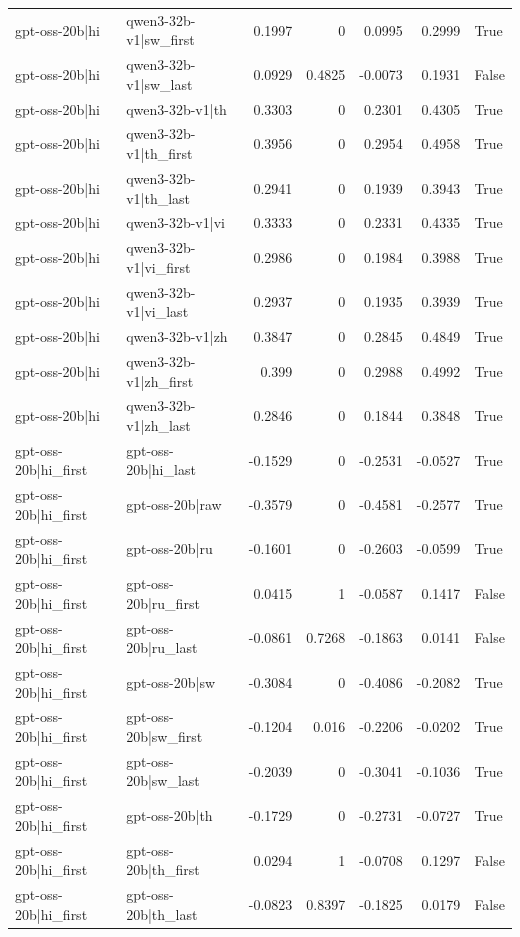 \begin{table}
\begin{tabular}{l l r r r r l}
gpt-oss-20b|hi & qwen3-32b-v1|sw_first & 0.1997 & 0 & 0.0995 & 0.2999 & True \\
gpt-oss-20b|hi & qwen3-32b-v1|sw_last & 0.0929 & 0.4825 & -0.0073 & 0.1931 & False \\
gpt-oss-20b|hi & qwen3-32b-v1|th & 0.3303 & 0 & 0.2301 & 0.4305 & True \\
gpt-oss-20b|hi & qwen3-32b-v1|th_first & 0.3956 & 0 & 0.2954 & 0.4958 & True \\
gpt-oss-20b|hi & qwen3-32b-v1|th_last & 0.2941 & 0 & 0.1939 & 0.3943 & True \\
gpt-oss-20b|hi & qwen3-32b-v1|vi & 0.3333 & 0 & 0.2331 & 0.4335 & True \\
gpt-oss-20b|hi & qwen3-32b-v1|vi_first & 0.2986 & 0 & 0.1984 & 0.3988 & True \\
gpt-oss-20b|hi & qwen3-32b-v1|vi_last & 0.2937 & 0 & 0.1935 & 0.3939 & True \\
gpt-oss-20b|hi & qwen3-32b-v1|zh & 0.3847 & 0 & 0.2845 & 0.4849 & True \\
gpt-oss-20b|hi & qwen3-32b-v1|zh_first & 0.399 & 0 & 0.2988 & 0.4992 & True \\
gpt-oss-20b|hi & qwen3-32b-v1|zh_last & 0.2846 & 0 & 0.1844 & 0.3848 & True \\
gpt-oss-20b|hi_first & gpt-oss-20b|hi_last & -0.1529 & 0 & -0.2531 & -0.0527 & True \\
gpt-oss-20b|hi_first & gpt-oss-20b|raw & -0.3579 & 0 & -0.4581 & -0.2577 & True \\
gpt-oss-20b|hi_first & gpt-oss-20b|ru & -0.1601 & 0 & -0.2603 & -0.0599 & True \\
gpt-oss-20b|hi_first & gpt-oss-20b|ru_first & 0.0415 & 1 & -0.0587 & 0.1417 & False \\
gpt-oss-20b|hi_first & gpt-oss-20b|ru_last & -0.0861 & 0.7268 & -0.1863 & 0.0141 & False \\
gpt-oss-20b|hi_first & gpt-oss-20b|sw & -0.3084 & 0 & -0.4086 & -0.2082 & True \\
gpt-oss-20b|hi_first & gpt-oss-20b|sw_first & -0.1204 & 0.016 & -0.2206 & -0.0202 & True \\
gpt-oss-20b|hi_first & gpt-oss-20b|sw_last & -0.2039 & 0 & -0.3041 & -0.1036 & True \\
gpt-oss-20b|hi_first & gpt-oss-20b|th & -0.1729 & 0 & -0.2731 & -0.0727 & True \\
gpt-oss-20b|hi_first & gpt-oss-20b|th_first & 0.0294 & 1 & -0.0708 & 0.1297 & False \\
gpt-oss-20b|hi_first & gpt-oss-20b|th_last & -0.0823 & 0.8397 & -0.1825 & 0.0179 & False \\

\end{tabular}
\end{table}
